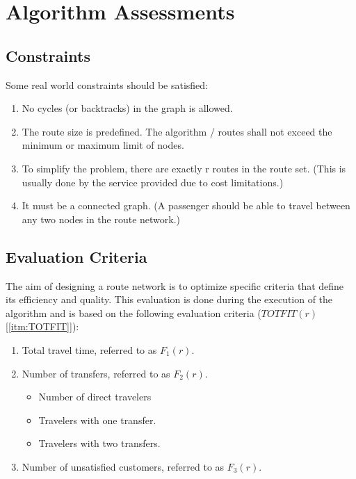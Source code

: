 \section{Algorithm Assessments}

\subsection{Constraints}
Some real world constraints should be satisfied:
\begin{enumerate}
\item \label{itm:constraintCycles} No cycles (or backtracks) in the graph is allowed.
\item \label{itm:constraintRouteSize} The route size is predefined. The algorithm / routes shall not exceed the minimum or maximum limit of nodes.
\item \label{itm:constraintRouteSet} To simplify the problem, there are exactly r routes in the route set. (This is usually done by the service provided due to cost limitations.)
\item \label{itm:criteriaConnectedGraph} It must be a connected graph. (A passenger should be able to travel between any two nodes in the route network.) 
\end{enumerate}

\subsection{Evaluation Criteria} 
The aim of designing a route network is to optimize specific criteria that define its efficiency and quality. This evaluation is done during the execution of the algorithm and is based on the following evaluation criteria ($TOTFIT(r)$ [\ref{itm:TOTFIT}]):
\begin{enumerate}
\item \label{itm:criteriaTotalTravelTime} Total travel time, referred to as $F_1(r)$.
\item \label{itm:f2} Number of transfers, referred to as $F_2(r)$.
\begin{itemize}
\item Number of direct travelers
\item Travelers with one transfer.
\item Travelers with two transfers.
\end{itemize}
\item \label{itm:TODO} Number of unsatisfied customers, referred to as $F_3(r)$. 
\end{enumerate}



